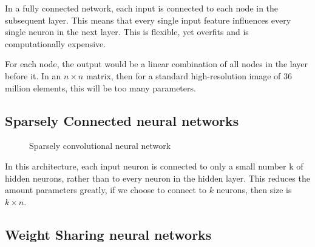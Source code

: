 \documentclass[11pt]{article}
\begin{document}
In a fully connected network, each input is connected to each node in the subsequent layer. This means that every single input feature influences every single neuron in the next layer. This is flexible, yet overfits and is computationally expensive.

For each node, the output would be a linear combination of all nodes in the layer before it. In an $n\times n$ matrix, then for a standard high-resolution image of 36 million elements, this will be too many parameters.

\subsection{Sparsely Connected neural networks }

\begin{figure}[H]
    \centering
    \caption{Sparsely convolutional neural network}
\end{figure}

In this architecture, each input neuron is connected to only a small number k of hidden neurons, rather than to every neuron in the hidden layer. This reduces the amount parameters greatly, if we choose to connect to $k$ neurons, then size is $k\times n$.

\subsection{Weight Sharing neural networks }
\end{document}

